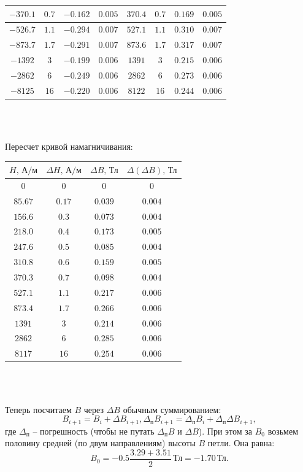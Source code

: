 \documentclass[a4paper]{article}
\begin{document}
\begin{enumerate}
\begin{center}
\begin{tabular}{|c|c|c|c|c|c|c|c|}
$-370.1$&$0.7$&$-0.162$&$0.005$&$370.4$&$0.7$&$0.169$&$0.005$\\\hline
$-526.7$&$1.1$&$-0.294$&$0.007$&$527.1$&$1.1$&$0.310$&$0.007$\\\hline
$-873.7$&$1.7$&$-0.291$&$0.007$&$873.6$&$1.7$&$0.317$&$0.007$\\\hline
$-1392$&$3$&$-0.199$&$0.006$&$1391$&$3$&$0.215$&$0.006$\\\hline
$-2862$&$6$&$-0.249$&$0.006$&$2862$&$6$&$0.273$&$0.006$\\\hline
$-8125$&$16$&$-0.220$&$0.006$&$8122$&$16$&$0.244$&$0.006$\\\hline
\end{tabular}\\~\\
\end{center}

Пересчет кривой намагничивания:
\begin{center}
\begin{tabular}{|c|c|c|c|}\hline
$H\text{, А/м}$&$\Delta H\text{, А/м}$&$\Delta B\text{, Тл}$&$\Delta (\Delta B)\text{, Тл}$\\\hline
$0$&$0$&$0$&$0$\\\hline
$85.67$&$0.17$&$0.039$&$0.004$\\\hline
$156.6$&$0.3$&$0.073$&$0.004$\\\hline
$218.0$&$0.4$&$0.173$&$0.005$\\\hline
$247.6$&$0.5$&$0.085$&$0.004$\\\hline
$310.8$&$0.6$&$0.159$&$0.005$\\\hline
$370.3$&$0.7$&$0.098$&$0.004$\\\hline
$527.1$&$1.1$&$0.217$&$0.006$\\\hline
$873.4$&$1.7$&$0.266$&$0.006$\\\hline
$1391$&$3$&$0.214$&$0.006$\\\hline
$2862$&$6$&$0.285$&$0.006$\\\hline
$8117$&$16$&$0.254$&$0.006$\\\hline
\end{tabular}\\~\\
\end{center}
Теперь посчитаем $B$ через $\Delta B$ обычным суммированием:
$$B_{i+1} = B_{i} + \Delta B_{i+1}, \Delta_\text{п} B_{i+1} = \Delta_\text{п} B_{i} + \Delta_\text{п} \Delta B_{i+1},$$
где $\Delta_\text{п}$ -- погрешность (чтобы не путать $\Delta_\text{п} B$ и $\Delta B$).
При этом за $B_0$ возьмем половину средней (по двум направлениям) высоты $B$ петли. Она равна:
$$B_0 = -0.5 \frac{3.29 + 3.51}{2}\,\text{Тл} = -1.70\,\text{Тл}.$$


\end{enumerate}
\end{document}
